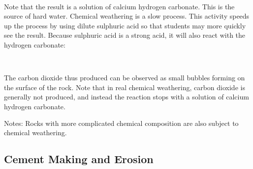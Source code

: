 \begin{multicols}{2}
\begin{description*}
{\begin{center}
\\	
\end{center}

Note that the result is a solution of calcium hydrogen carbonate. This is the source of hard water.
Chemical weathering is a slow process. This activity speeds up the process by using dilute sulphuric acid so that students may more quickly see the result. Because sulphuric acid is a strong acid, it will also react with the hydrogen carbonate:\\
\begin{center}
\\	
\end{center}
The carbon dioxide thus produced can be observed as small bubbles forming on the surface of the rock. Note that in real chemical weathering, carbon dioxide is generally not produced, and instead the reaction stops with a solution of calcium hydrogen carbonate.}
\item[Notes:]{Rocks with more complicated chemical composition are also subject to chemical weathering.}
\end{description*}

\vfill
\columnbreak

\subsection{Cement Making and Erosion} 



\end{multicols}
